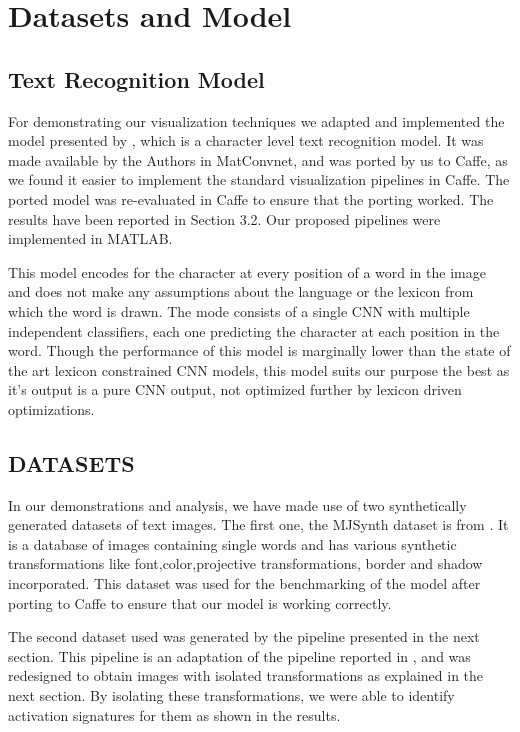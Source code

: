 \documentclass[10pt,twocolumn,letterpaper]{article}
\begin{document}
\section{Datasets and Model}


\subsection{Text Recognition Model}
For demonstrating our visualization techniques we adapted and implemented the model presented by \cite{Jaderberg14c}, which is a character level text recognition model. It was made available by the Authors in MatConvnet, and was ported by us to Caffe, as we found it easier to implement the standard visualization pipelines in Caffe. The ported model was re-evaluated in Caffe to ensure that the porting worked. The results have been reported in Section 3.2. Our proposed pipelines were implemented in MATLAB.


This  model encodes for the character at every position of a word in the image and does not make any assumptions about the language or the lexicon from which the word is drawn. The  mode consists of a single CNN with multiple independent classifiers, each one predicting the character at each position in the word. Though the performance of this model is marginally lower than the state of the art lexicon constrained CNN models, this model suits our purpose the best as it's output is a pure CNN output, not optimized further by lexicon driven optimizations. 


\subsection{DATASETS}
In our demonstrations and analysis, we have made use of two synthetically generated datasets of text images. The first one, the MJSynth dataset is from \cite{Jaderberg14c}. It is a database of images containing single words and has various synthetic transformations like font,color,projective transformations, border and shadow incorporated. This dataset was used for the benchmarking of the model after porting to Caffe to ensure that our model is working correctly.


The second dataset used was generated by the pipeline presented in the next section. This pipeline is an adaptation of the pipeline reported in \cite{Gupta16}, and was redesigned to obtain images with isolated transformations as explained in the next section. By isolating these transformations, we were able to identify activation signatures for them as shown in the results.
\end{document}
